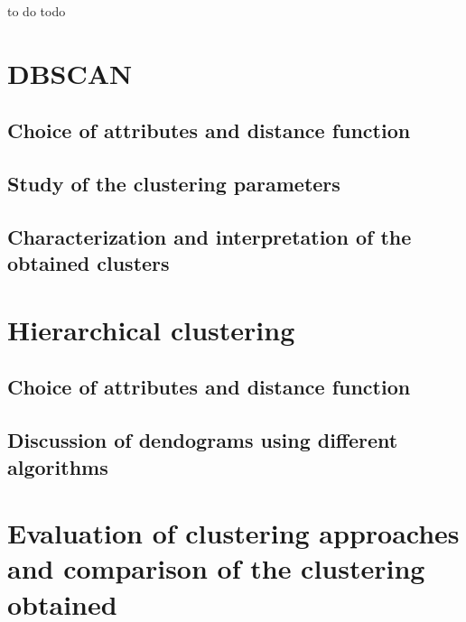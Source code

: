 to do todo

\section{DBSCAN}
\subsection{Choice of attributes and distance function}
\subsection{Study of the clustering parameters}
\subsection{Characterization and interpretation of the obtained clusters}
\section{Hierarchical clustering}
\subsection{Choice of attributes and distance function}
\subsection{Discussion of dendograms using different algorithms}

\section{Evaluation of clustering approaches and comparison of the clustering obtained}
